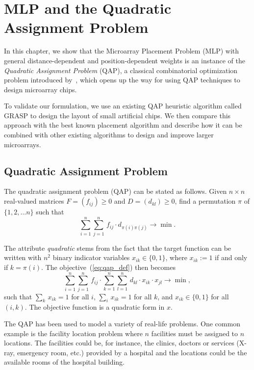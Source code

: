 \chapter{MLP and the Quadratic Assignment Problem}
\label{ch:qap}

In this chapter, we show that the Microarray Placement Problem (MLP) with
general distance-dependent and position-dependent weights is an instance of the
\emph{Quadratic Assignment Problem} (QAP), a classical combinatorial
optimization problem introduced by~\citet{Koopmans1957}, which opens up the way
for using QAP techniques to design microarray chips.

To validate our formulation, we use an existing QAP heuristic algorithm called
GRASP to design the layout of small artificial chips. We then compare this
approach with the best known placement algorithm and describe how it can be
combined with other existing algorithms to design and improve larger
microarrays.

\section{Quadratic Assignment Problem}
\label{sec:qap_qap}

The quadratic assignment problem (QAP) can be stated as follows. Given
$n \times n$ real-valued matrices $F = (f_{ij})\geq 0$ and $D = (d_{kl})\geq 0$,
find a permutation $\pi$ of $\{1, 2, \ldots n\}$ such that
\begin{equation}\label{eq:qap_def}
  \sum_{i=1}^{n} \sum_{j=1}^{n}\,  f_{ij} \cdot d_{\pi(i)\pi(j)} \to \min.
\end{equation}

The attribute \emph{quadratic} stems from the fact that the target function can
be written with $n^2$ binary indicator variables $x_{ik}\in\{0,1\}$, where
$x_{ik}:=1$ if and only if $k=\pi(i)$. The objective~(\ref{eq:qap_def}) then
becomes
\[
  \sum_{i=1}^{n} \sum_{j=1}^{n}\,  f_{ij} \cdot 
  \sum_{k=1}^{n} \sum_{l=1}^{n}\,  d_{kl} \cdot x_{ik}\cdot x_{jl}
  \to \min,
\]
such that $\sum_{k}\, x_{ik}=1$ for all $i$, $\sum_{i}\, x_{ik}=1$ for all $k$,
and $x_{ik}\in\{0,1\}$ for all $(i,k)$. The objective function is a quadratic
form in $x$.

The QAP has been used to model a variety of real-life problems. One common
example is the facility location problem where $n$ facilities must be assigned
to $n$ locations. The facilities could be, for instance, the clinics, doctors or
services (X-ray, emergency room, etc.) provided by a hospital and the locations
could be the available rooms of the hospital building.

